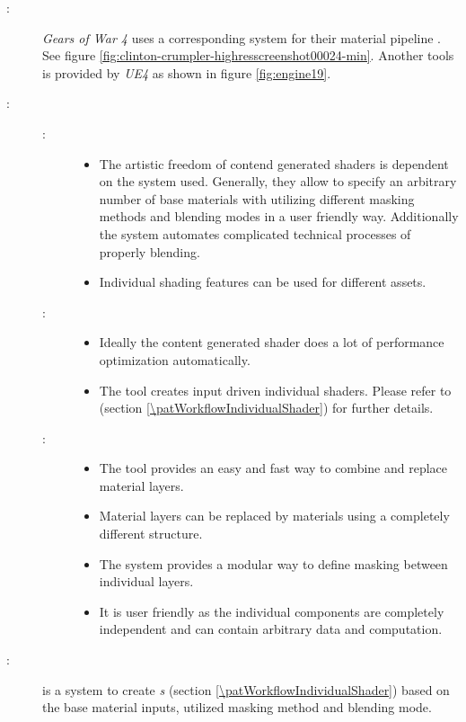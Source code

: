\begin{description}
	\item[\patExamples:]%
	\emph{Gears of War 4} \cite{gears2016coalition} uses a corresponding system for their material pipeline \cite{colin2017GearsOfWar}. See figure \ref{fig:clinton-crumpler-highresscreenshot00024-min}. Another tools is provided by \emph{UE4} as shown in figure \ref{fig:engine19}. 
	\item[\patConsequences:]\hfill 
		\begin{description}
			\item[\visual:]\hfill
			\begin{itemize}\mynobreakpar
				\item The  artistic freedom of contend generated shaders is dependent on the system used. Generally, they allow to specify an arbitrary number of base materials with utilizing different masking methods and blending modes in a user friendly way. Additionally the system automates complicated technical processes of properly blending. 
				\item Individual shading features can be used for different assets. 
			\end{itemize}
			\item[\performance:]\hfill
			\begin{itemize}\mynobreakpar
				\item Ideally the content generated shader does a lot of performance optimization automatically. 
				\item The tool creates input driven individual shaders. Please refer to \emph{\patWorkflowIndividualShader} (section \ref{\patWorkflowIndividualShader}) for further details.   
			\end{itemize}
			\item[\pipeline:]\hfill
			\begin{itemize}\mynobreakpar
				\item The tool provides an easy and fast way to combine and replace material layers. 
				\item Material layers can be replaced by materials using a completely different structure. 
				\item The system provides a modular way to define masking between individual layers.
				\item It is user friendly as the individual components are completely independent and can contain arbitrary data and computation. 
			\end{itemize}
		\end{description}
	\item[\patRelations:]%
	\emph{\patWorkflowContentDrivenShader} is a system to create \emph{\patWorkflowIndividualShader s} (section \ref{\patWorkflowIndividualShader}) based on the base material inputs, utilized masking method and blending mode.
\end{description}


